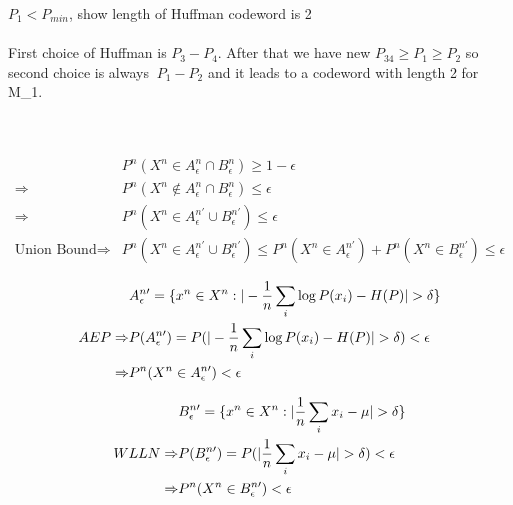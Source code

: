 \documentclass[
  course = {{EE623 Information Theory}},
  quartile = {{Fall 2020}},
  assignment = 3,
  name = {{Mohammad Mahdi Rahimi}},
  studentnumber = {{20208244}},
  email = {{mahi@kaist.ac.kr}},
  firstexercise = 1
]{aga-homework}
\begin{document}
\subexercise $P_{1} < P_{min}$, show length of Huffman codeword is 2 
\\\\
First choice of Huffman is $P_3 - P_4$. After that we have new $P_{34} \ge P_1 \ge P_2$ so second choice is always $\ P_1 - P_2$ and it leads to a codeword with length 2 for M_1.

\exercise
\subexercise
\\\\

\begin{equation}
    \begin{split}
        & P^n(X^n \in A^n_\epsilon \cap B^n_\epsilon) \ge 1 - \epsilon\\
        \Rightarrow & P^n(X^n \notin A^n_\epsilon \cap B^n_\epsilon) \le \epsilon\\
        \Rightarrow & P^n(X^n \in A^{n\prime}_\epsilon \cup B^{n\prime}_\epsilon) \le \epsilon\\
        \text{Union Bound} \Rightarrow & P^n(X^n \in A^{n\prime}_\epsilon \cup B^{n\prime}_\epsilon) \le P^n(X^n \in A^{n\prime}_\epsilon) + P^n(X^n \in  B^{n\prime}_\epsilon) \le \epsilon
    \end{split}
\end{equation}

\begin{equation}
    \begin{split}
        & A^{n\prime}_\epsilon = \{x^n \in X^n : |-{1 \over n}\sum_i{\log{P(x_i)}} - H(P)| > \delta\} \\
        AEP \Rightarrow & P(A^{n\prime}_\epsilon) = P(|-{1 \over n}\sum_i{\log{P(x_i)}} - H(P)| > \delta) < \epsilon\\
        \Rightarrow & P^n(X^n \in A^{n\prime}_\epsilon) < \epsilon
    \end{split}
\end{equation}

\begin{equation}
    \begin{split}
        & B^{n\prime}_\epsilon = \{x^n \in X^n : |{1 \over n}\sum_i{x_i} - \mu| > \delta\} \\
        WLLN \Rightarrow & P(B^{n\prime}_\epsilon) = P(|{1 \over n}\sum_i{x_i} - \mu| > \delta) < \epsilon\\
        \Rightarrow & P^n(X^n \in B^{n\prime}_\epsilon) < \epsilon
    \end{split}
\end{equation}
\end{document}
